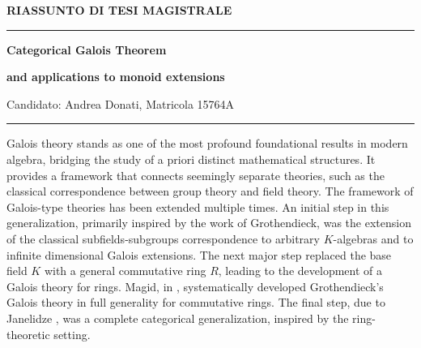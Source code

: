 \documentclass[11pt, a4paper]{article}
\theoremstyle{plain}
\theoremstyle{definition}
\begin{document}
	\begin{center}
		{\bf RIASSUNTO DI TESI MAGISTRALE }
		\vskip0.6cm
			\hrule
			
			\vskip0.4cm 
	{\bf \large	 Categorical Galois Theorem\\      }
		
		\vskip0.2cm 
			{\bf \large and applications to monoid extensions }
		
		
		\vskip0.4cm 
		
	{  \large Candidato: Andrea Donati,  \hspace{1cm}  Matricola 15764A}
		
	\end{center} 


	\hrule
	
\vspace{1cm}
   

Galois theory stands as one of the most profound foundational results in modern algebra, bridging the study of a priori distinct mathematical structures. It provides a framework that connects seemingly separate theories, such as the classical correspondence between group theory and field theory. The framework of Galois-type theories has been extended multiple times. An initial step in this generalization, primarily inspired by the work of Grothendieck, was the extension of the classical subfields-subgroups correspondence to arbitrary $K$-algebras and to infinite dimensional Galois extensions. The next major step replaced the base field $K$ with a general commutative ring $R$, leading to the development of a Galois theory for rings. Magid, in \cite{magid2014separable}, systematically developed Grothendieck's Galois theory in full generality for commutative rings. The final step, due to Janelidze \cite{JANELIDZE1990270}, was a complete categorical generalization, inspired by the ring-theoretic setting.

\medskip
\end{document}
